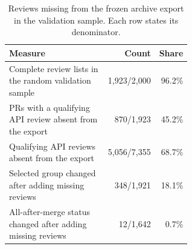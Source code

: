 \begin{table}[H]
\centering
\caption{Reviews missing from the frozen archive export in the validation sample. Each row states its denominator.}
\label{tab:audit}
\small
\begin{tabular}{@{}p{0.60\linewidth}rr@{}}
\toprule
Measure & Count & Share \\
\midrule
Complete review lists in the random validation sample & 1,923/2,000 & 96.2\% \\
PRs with a qualifying API review absent from the export & 870/1,923 & 45.2\% \\
Qualifying API reviews absent from the export & 5,056/7,355 & 68.7\% \\
Selected group changed after adding missing reviews & 348/1,921 & 18.1\% \\
All-after-merge status changed after adding missing reviews & 12/1,642 & 0.7\% \\
\bottomrule
\end{tabular}
\end{table}
